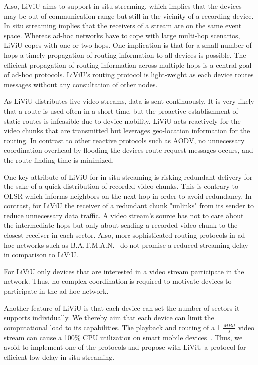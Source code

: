 Also, \ac{LiViU} aims to support in situ streaming, which implies that the devices may be out of communication range but still in the vicinity of a recording device.
In situ streaming implies that the receivers of a stream are on the same event space.
Whereas ad-hoc networks have to cope with large multi-hop scenarios, \ac{LiViU} copes with one or two hops.
One implication is that for a small number of hops a timely propagation of routing information to all devices is possible.
The efficient propagation of routing information across multiple hops is a central goal of ad-hoc protocols.
\ac{LiViU}'s routing protocol is light-weight as each device routes messages without any consultation of other nodes.

As \ac{LiViU} distributes live video streams, data is sent continuously. 
It is very likely that a route is used often in a short time, but the proactive establishment of static routes is infeasible due to device mobility.
\ac{LiViU} acts reactively for the video chunks that are transmitted but leverages geo-location information for the routing.
In contrast to other reactive protocols such as \ac{AODV}, no unnecessary coordination overhead by flooding the devices route request messages occurs, and the route finding time is minimized.

One key attribute of \ac{LiViU} for in situ streaming is risking redundant delivery for the sake of a quick distribution of recorded video chunks.
This is contrary to \ac{OLSR} which informs neighbors on the next hop in order to avoid redundancy.
In contrast, for \ac{LiViU} the receiver of a redundant chunk "unlinks" from its sender to reduce unnecessary data traffic. 
A video stream's source has not to care about the intermediate hops but only about sending a recorded video chunk to the closest receiver in each sector.
Also, more sophisticated routing protocols in ad-hoc networks such as \ac{B.A.T.M.A.N.}~\cite{batmanDraft} do not promise a reduced streaming delay in comparison to \ac{LiViU}.

For \ac{LiViU} only devices that are interested in a video stream participate in the network.
Thus, no complex coordination is required to motivate devices to participate in the ad-hoc network.

Another feature of \ac{LiViU} is that each device can set the number of sectors it supports individually.
We thereby aim that each device can limit the computational load to its capabilities.
The playback and routing of a 1 $\frac{MBit}{s}$ video stream can cause a 100\% CPU utilization on smart mobile devices~\cite{Halvorsen2008}. 
Thus, we avoid to implement one of the protocols and propose with \ac{LiViU} a protocol for efficient low-delay in situ streaming.

